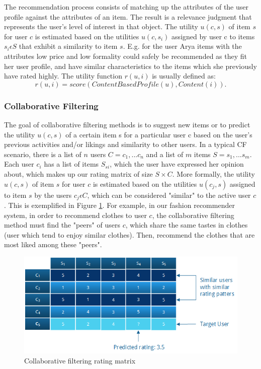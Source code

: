 The recommendation process consists of matching up the attributes of the user profile against the attributes of an item. The result is a relevance judgment that represents the user's level of interest in that object. The utility $u(c, s)$ of item $s$ for user $c$ is estimated based on the utilities $u(c, s_{i})$ assigned by user c to items $s_{i} \epsilon S$ that exhibit a similarity to item $s$. E.g. for the user Arya items with the attributes low price and low formality could safely be recommended as they fit her user profile, and have similar characteristics to the items which she previously have rated highly. The utility function $r(u, i)$ is usually defined as:
\begin{equation}
r(u,i) = score(ContentBasedProfile(u), Content(i)).
\end{equation}

\subsubsection{Collaborative Filtering}

The goal of collaborative filtering methods is to suggest new items or to predict the utility $u(c, s)$ of a certain item s for a particular user c based on the user's previous activities and/or likings and similarity to other users. In a typical CF scenario, there is a list of $n$ users $C = {c_{1}, ... c_{n}}$ and a list of $m$ items $S = {s_{1},...s_{m}}$. Each user $c_{i}$ has a list of items $S_{si}$, which the user have expressed her opinion about, which makes up our rating matrix of size $S \times C$. More formally, the utility $u(c, s)$ of item $s$ for user $c$ is estimated based on the utilities $u(c_{j}, s)$ assigned to item $s$ by the users $c_{j} \epsilon C$, which can be considered "similar" to the active user $c$. This is exemplified in Figure \ref{figure:ratingmatrix}. For example, in our fashion recommender system, in order to recommend clothes to user $c$, the collaborative filtering method must find the "peers" of users $c$, which share the same tastes in clothes (user which tend to enjoy similar clothes). Then, recommend the clothes that are most liked among these "peers".

\begin{figure}[H]
    \includegraphics[width=5in]{image/ratingmatrix.png}
    \centering
    \caption[Collaborative filtering rating matrix]{Collaborative filtering rating matrix}
    \label{figure:ratingmatrix}
\end{figure}

